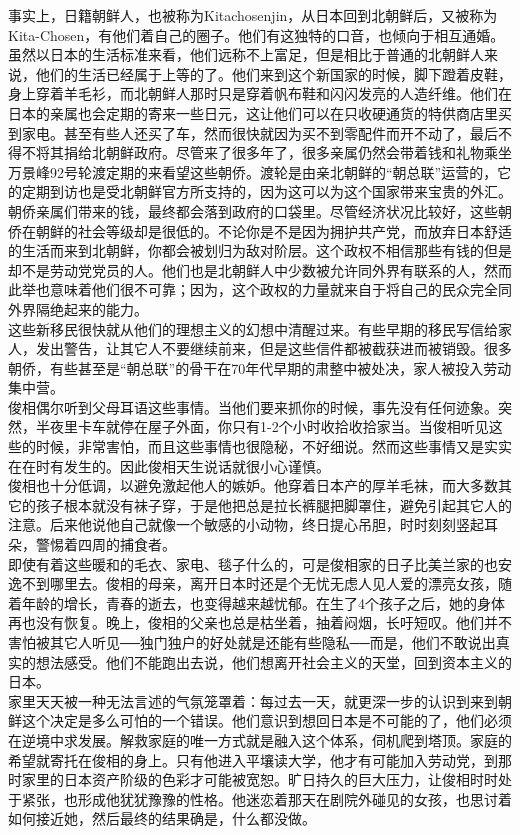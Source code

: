 事实上，日籍朝鲜人，也被称为Kitachosenjin，从日本回到北朝鲜后，又被称为Kita-Chosen，有他们着自己的圈子。他们有这独特的口音，也倾向于相互通婚。虽然以日本的生活标准来看，他们远称不上富足，但是相比于普通的北朝鲜人来说，他们的生活已经属于上等的了。他们来到这个新国家的时候，脚下蹬着皮鞋，身上穿着羊毛衫，而北朝鲜人那时只是穿着帆布鞋和闪闪发亮的人造纤维。他们在日本的亲属也会定期的寄来一些日元，这让他们可以在只收硬通货的特供商店里买到家电。甚至有些人还买了车，然而很快就因为买不到零配件而开不动了，最后不得不将其捐给北朝鲜政府。尽管来了很多年了，很多亲属仍然会带着钱和礼物乘坐万景峰92号轮渡定期的来看望这些朝侨。渡轮是由亲北朝鲜的“朝总联”运营的，它的定期到访也是受北朝鲜官方所支持的，因为这可以为这个国家带来宝贵的外汇。朝侨亲属们带来的钱，最终都会落到政府的口袋里。尽管经济状况比较好，这些朝侨在朝鲜的社会等级却是很低的。不论你是不是因为拥护共产党，而放弃日本舒适的生活而来到北朝鲜，你都会被划归为敌对阶层。这个政权不相信那些有钱的但是却不是劳动党党员的人。他们也是北朝鲜人中少数被允许同外界有联系的人，然而此举也意味着他们很不可靠；因为，这个政权的力量就来自于将自己的民众完全同外界隔绝起来的能力。\\

这些新移民很快就从他们的理想主义的幻想中清醒过来。有些早期的移民写信给家人，发出警告，让其它人不要继续前来，但是这些信件都被截获进而被销毁。很多朝侨，有些甚至是“朝总联”的骨干在70年代早期的肃整中被处决，家人被投入劳动集中营。\\

俊相偶尔听到父母耳语这些事情。当他们要来抓你的时候，事先没有任何迹象。突然，半夜里卡车就停在屋子外面，你只有1-2个小时收拾收拾家当。当俊相听见这些的时候，非常害怕，而且这些事情也很隐秘，不好细说。然而这些事情又是实实在在时有发生的。因此俊相天生说话就很小心谨慎。\\

俊相也十分低调，以避免激起他人的嫉妒。他穿着日本产的厚羊毛袜，而大多数其它的孩子根本就没有袜子穿，于是他把总是拉长裤腿把脚罩住，避免引起其它人的注意。后来他说他自己就像一个敏感的小动物，终日提心吊胆，时时刻刻竖起耳朵，警惕着四周的捕食者。\\

即使有着这些暖和的毛衣、家电、毯子什么的，可是俊相家的日子比美兰家的也安逸不到哪里去。俊相的母亲，离开日本时还是个无忧无虑人见人爱的漂亮女孩，随着年龄的增长，青春的逝去，也变得越来越忧郁。在生了4个孩子之后，她的身体再也没有恢复。晚上，俊相的父亲也总是枯坐着，抽着闷烟，长吁短叹。他们并不害怕被其它人听见──独门独户的好处就是还能有些隐私──而是，他们不敢说出真实的想法感受。他们不能跑出去说，他们想离开社会主义的天堂，回到资本主义的日本。\\

家里天天被一种无法言述的气氛笼罩着：每过去一天，就更深一步的认识到来到朝鲜这个决定是多么可怕的一个错误。他们意识到想回日本是不可能的了，他们必须在逆境中求发展。解救家庭的唯一方式就是融入这个体系，伺机爬到塔顶。家庭的希望就寄托在俊相的身上。只有他进入平壤读大学，他才有可能加入劳动党，到那时家里的日本资产阶级的色彩才可能被宽恕。旷日持久的巨大压力，让俊相时时处于紧张，也形成他犹犹豫豫的性格。他迷恋着那天在剧院外碰见的女孩，也思讨着如何接近她，然后最终的结果确是，什么都没做。\\
